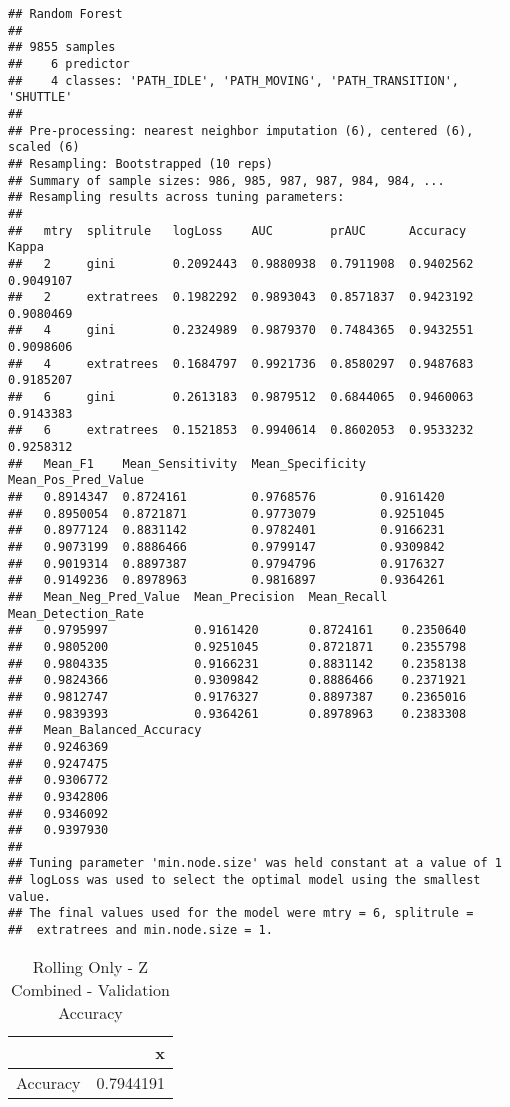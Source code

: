 \documentclass[]{article}
\begin{document}
\begin{verbatim}
## Random Forest 
## 
## 9855 samples
##    6 predictor
##    4 classes: 'PATH_IDLE', 'PATH_MOVING', 'PATH_TRANSITION', 'SHUTTLE' 
## 
## Pre-processing: nearest neighbor imputation (6), centered (6), scaled (6) 
## Resampling: Bootstrapped (10 reps) 
## Summary of sample sizes: 986, 985, 987, 987, 984, 984, ... 
## Resampling results across tuning parameters:
## 
##   mtry  splitrule   logLoss    AUC        prAUC      Accuracy   Kappa    
##   2     gini        0.2092443  0.9880938  0.7911908  0.9402562  0.9049107
##   2     extratrees  0.1982292  0.9893043  0.8571837  0.9423192  0.9080469
##   4     gini        0.2324989  0.9879370  0.7484365  0.9432551  0.9098606
##   4     extratrees  0.1684797  0.9921736  0.8580297  0.9487683  0.9185207
##   6     gini        0.2613183  0.9879512  0.6844065  0.9460063  0.9143383
##   6     extratrees  0.1521853  0.9940614  0.8602053  0.9533232  0.9258312
##   Mean_F1    Mean_Sensitivity  Mean_Specificity  Mean_Pos_Pred_Value
##   0.8914347  0.8724161         0.9768576         0.9161420          
##   0.8950054  0.8721871         0.9773079         0.9251045          
##   0.8977124  0.8831142         0.9782401         0.9166231          
##   0.9073199  0.8886466         0.9799147         0.9309842          
##   0.9019314  0.8897387         0.9794796         0.9176327          
##   0.9149236  0.8978963         0.9816897         0.9364261          
##   Mean_Neg_Pred_Value  Mean_Precision  Mean_Recall  Mean_Detection_Rate
##   0.9795997            0.9161420       0.8724161    0.2350640          
##   0.9805200            0.9251045       0.8721871    0.2355798          
##   0.9804335            0.9166231       0.8831142    0.2358138          
##   0.9824366            0.9309842       0.8886466    0.2371921          
##   0.9812747            0.9176327       0.8897387    0.2365016          
##   0.9839393            0.9364261       0.8978963    0.2383308          
##   Mean_Balanced_Accuracy
##   0.9246369             
##   0.9247475             
##   0.9306772             
##   0.9342806             
##   0.9346092             
##   0.9397930             
## 
## Tuning parameter 'min.node.size' was held constant at a value of 1
## logLoss was used to select the optimal model using the smallest value.
## The final values used for the model were mtry = 6, splitrule =
##  extratrees and min.node.size = 1.
\end{verbatim}

\begin{table}[!h]

\caption{\label{tab:sensor-z-combined-rolling-only-rf-results}Rolling Only - Z Combined - Validation Accuracy}
\centering
\begin{tabular}[t]{lr}
\toprule
  & x\\
\midrule
Accuracy & 0.7944191\\
\bottomrule
\end{tabular}
\end{table}
\end{document}
